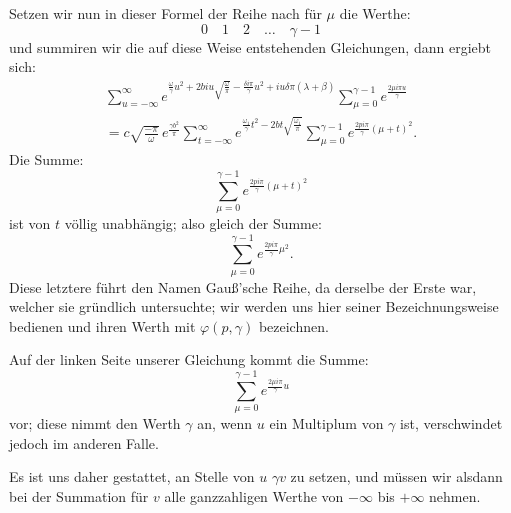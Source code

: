 \documentclass[10pt]{article}
\newcommand{\sourceanchor}[1]{\hypertarget{source-#1}{}}
\begin{document}
Setzen wir nun in dieser Formel der Reihe nach für \(\mu\) die Werthe:
\[
0\quad 1\quad 2\quad \ldots\quad \gamma-1
\]
und summiren wir die auf diese Weise entstehenden Gleichungen, dann ergiebt sich:
\begin{multline*}
\sum_{u=-\infty}^{\infty}
 e^{\frac{\omega}{\gamma}u^{2}+2biu\sqrt{\frac{\omega}{\pi}}-\frac{\delta i\pi}{\gamma}u^{2}+iu\delta\pi(\lambda+\beta)}
\sum_{\mu=0}^{\gamma-1}e^{\frac{2\mu i\pi u}{\gamma}}\\
=c\sqrt{\frac{-\pi}{\omega}}\,e^{\frac{\gamma b^{2}}{\pi}}
\sum_{t=-\infty}^{\infty}e^{\frac{\omega_{1}}{\gamma}t^{2}-2bt\sqrt{\frac{\omega_{1}}{\pi}}}
\sum_{\mu=0}^{\gamma-1}e^{\frac{2p i\pi}{\gamma}(\mu+t)^{2}}.
\end{multline*}
Die Summe:
\[
\sum_{\mu=0}^{\gamma-1}e^{\frac{2p i\pi}{\gamma}(\mu+t)^{2}}
\]
\sourceanchor{PA14}
ist von \(t\) völlig unabhängig; also gleich der Summe:
\[
\sum_{\mu=0}^{\gamma-1}e^{\frac{2p i\pi}{\gamma}\mu^{2}}.
\]
Diese letztere führt den Namen Gauß'sche Reihe, da derselbe der Erste war, welcher sie gründlich untersuchte; wir werden uns hier seiner Bezeichnungsweise bedienen und ihren Werth mit \(\varphi(p,\gamma)\) bezeichnen.

Auf der linken Seite unserer Gleichung kommt die Summe:
\[
\sum_{\mu=0}^{\gamma-1}e^{\frac{2\mu i\pi}{\gamma}u}
\]
vor; diese nimmt den Werth \(\gamma\) an, wenn \(u\) ein Multiplum von \(\gamma\) ist, verschwindet jedoch im anderen Falle.

Es ist uns daher gestattet, an Stelle von \(u\) \(\gamma v\) zu setzen, und müssen wir alsdann bei der Summation für \(v\) alle ganzzahligen Werthe von \(-\infty\) bis \(+\infty\) nehmen.
\end{document}
